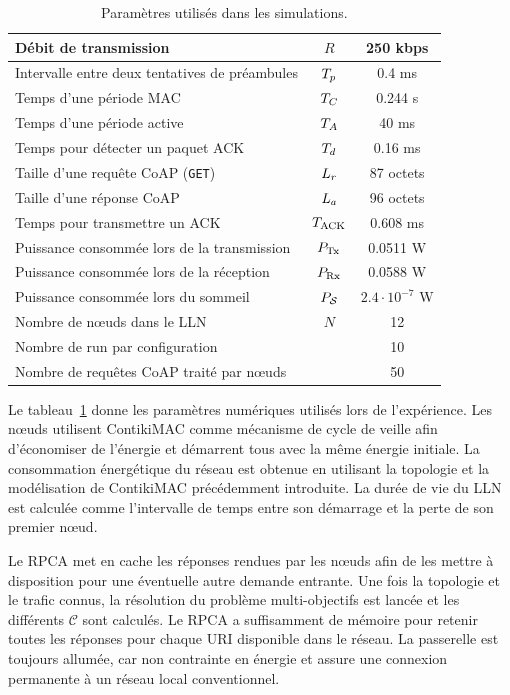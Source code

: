 \begin{table}[ht]
\centering
\begin{tabular}{|l|c|c|}
\hline
Débit de transmission & $R$ & 250 kbps \\
\hline
Intervalle entre deux tentatives de préambules & $T_p$ & 0.4 ms \\
\hline
Temps d'une période MAC & $T_C$ & 0.244 s\\
\hline
Temps d'une période active & $T_A$ & 40 ms\\
\hline
Temps pour détecter un paquet \ac{ACK} & $T_d$ & 0.16 ms \\
\hline
Taille d'une requête CoAP (\texttt{GET}) & $L_r$ & 87 octets\\
\hline
Taille d'une réponse CoAP & $L_a$ & 96 octets \\
\hline
Temps pour transmettre un \ieee{} \ac{ACK} & $T_{\textrm{ACK}}$ & 0.608 ms  \\
\hline
Puissance consommée lors de la transmission & $P_{\textrm{Tx}} $ & 0.0511 W  \\
\hline
Puissance consommée lors de la réception & $P_{\textrm{Rx}} $ & 0.0588 W  \\
\hline
Puissance consommée lors du sommeil & $P_{\mathcal{S}}$ & $2.4\cdot 10^{-7}$ W \\
\hline
Nombre de nœuds dans le \ac{LLN}  & $N$ & 12 \\
\hline
Nombre de run par configuration &  & 10  \\
\hline
Nombre de requêtes \ac{CoAP} traité par nœuds &  & 50 \\
\hline
\end{tabular}
\caption{Paramètres utilisés dans les simulations.}

\label{cache:table:sim_parameters}
\end{table}

Le tableau~\ref{cache:table:sim_parameters} donne les paramètres numériques utilisés lors de l'expérience.
Les nœuds utilisent ContikiMAC comme mécanisme de cycle de veille afin d'économiser de l'énergie et démarrent tous avec la même énergie initiale.
La consommation énergétique du réseau est obtenue en utilisant la topologie et la modélisation de ContikiMAC précédemment introduite.
La durée de vie du \ac{LLN} est calculée comme l'intervalle de temps entre son démarrage et la perte de son premier nœud.

Le \ac{RPCA} met en cache les réponses rendues par les nœuds afin de les mettre à disposition pour une éventuelle autre demande entrante.
Une fois la topologie et le trafic connus, la résolution du problème multi-objectifs est lancée et les différents $\mathcal{C}$ sont calculés.
Le \ac{RPCA} a suffisamment de mémoire pour retenir toutes les réponses pour chaque \ac{URI} disponible dans le réseau.
La passerelle est toujours allumée, car non contrainte en énergie et assure une connexion permanente à un réseau local conventionnel.

